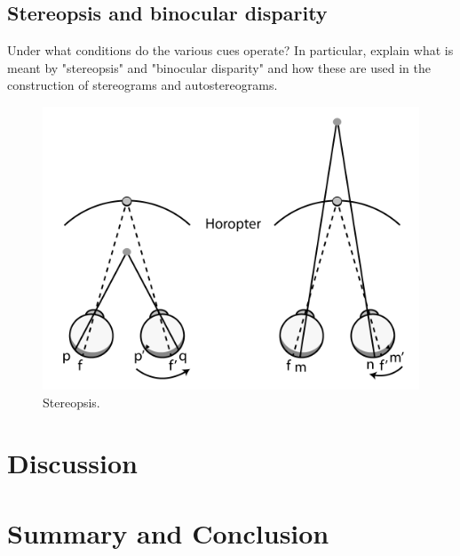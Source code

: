 \subsection{Stereopsis and binocular disparity}
Under what conditions do the various cues operate? In particular, explain what is meant by "stereopsis" and "binocular disparity" and how these are used in the construction of stereograms and autostereograms.

\begin{figure}[H]
	\centering
	\includegraphics[width=1\linewidth]{figure/Analysis/stereopsis.png}
	\caption{Stereopsis.}
	\label{fig:stereopsis}
\end{figure}


\section{Discussion}

\section{Summary and Conclusion}


